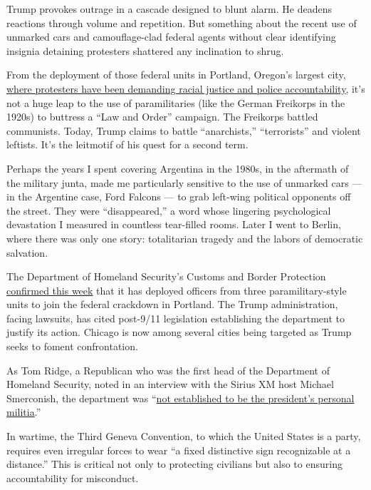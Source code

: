 Trump provokes outrage in a cascade designed to blunt alarm. He deadens
reactions through volume and repetition. But something about the recent
use of unmarked cars and camouflage-clad federal agents without clear
identifying insignia detaining protesters shattered any inclination to
shrug.

From the deployment of those federal units in Portland, Oregon's largest
city,
\href{https://www.nytimes.com/2020/07/24/us/portland-oregon-protests-white-race.html}{where
protesters have been demanding racial justice and police
accountability}, it's not a huge leap to the use of paramilitaries (like
the German Freikorps in the 1920s) to buttress a ``Law and Order''
campaign. The Freikorps battled communists. Today, Trump claims to
battle ``anarchists,'' ``terrorists'' and violent leftists. It's the
leitmotif of his quest for a second term.

Perhaps the years I spent covering Argentina in the 1980s, in the
aftermath of the military junta, made me particularly sensitive to the
use of unmarked cars --- in the Argentine case, Ford Falcons --- to grab
left-wing political opponents off the street. They were ``disappeared,''
a word whose lingering psychological devastation I measured in countless
tear-filled rooms. Later I went to Berlin, where there was only one
story: totalitarian tragedy and the labors of democratic salvation.

The Department of Homeland Security's Customs and Border Protection
\href{https://www.google.com/url?q=https://www.reuters.com/article/us-global-race-protests-agents/us-homeland-security-confirms-three-units-sent-paramilitary-officers-to-portland-idUSKCN24M2RL\&sa=D\&ust=1595604281633000\&usg=AFQjCNESMShE-qwX6DEJY8-UmYcYsMRIdg}{confirmed
this week} that it has deployed officers from three paramilitary-style
units to join the federal crackdown in Portland. The Trump
administration, facing lawsuits, has cited post-9/11 legislation
establishing the department to justify its action. Chicago is now among
several cities being targeted as Trump seeks to foment confrontation.

As Tom Ridge, a Republican who was the first head of the Department of
Homeland Security, noted in an interview with the Sirius XM host Michael
Smerconish, the department was
``\href{https://www.siriusxm.com/clips/clip/a9914a41-78d6-4402-8150-b8f14a44945b/715571de-a566-4492-ba13-bbe09f516300}{not
established to be the president's personal militia}.''

In wartime, the Third Geneva Convention, to which the United States is a
party, requires even irregular forces to wear ``a fixed distinctive sign
recognizable at a distance.'' This is critical not only to protecting
civilians but also to ensuring accountability for misconduct.

